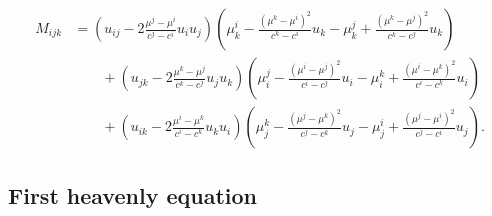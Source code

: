 \documentclass[12pt, a4paper]{article}
\theoremstyle{definition}
\begin{document}
\begin{align*}
	M_{ijk} &= \left( u_{ij} - 2 \frac{\mu^j-\mu^i}{c^j-c^i} u_i u_j \right) \left( \mu^i_k - \frac{(\mu^k - \mu^i)^2}{c^k - c^i}u_k - \mu^j_k + \frac{(\mu^k - \mu^j)^2}{c^k - c^j}u_k \right) \\
	&\qquad + \left( u_{jk} - 2 \frac{\mu^k-\mu^j}{c^k-c^j} u_j u_k \right) \left( \mu^j_i - \frac{(\mu^i - \mu^j)^2}{c^i - c^j}u_i - \mu^k_i + \frac{(\mu^i - \mu^k)^2}{c^i - c^k}u_i \right) \\
	&\qquad + \left( u_{ik} - 2 \frac{\mu^i-\mu^k}{c^i-c^k} u_k u_i \right) \left( \mu^k_j - \frac{(\mu^j - \mu^k)^2}{c^j - c^k}u_j - \mu^i_j + \frac{(\mu^j - \mu^i)^2}{c^j - c^i}u_j \right).
\end{align*}





\subsection{First heavenly equation}
\end{document}
